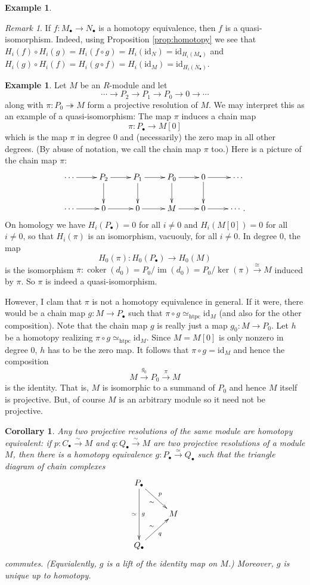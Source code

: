 \documentclass{amsart}[12pt]
\def\htpy{\simeq_{\mathrm{htpc}}}
\def\image{\operatorname{im}}
\def\im{\image}
\def\ker{\operatorname{ker}}
\def\coker{\operatorname{coker}}
\newcommand{\onto}{\twoheadrightarrow}
\newcommand{\id}{\mathrm{id}}
\numberwithin{equation}{section}
\theoremstyle{plain} %
\newtheorem{cor}[equation]{Corollary}
\theoremstyle{definition}
\newtheorem{ex}[equation]{Example}
\theoremstyle{remark}
\newtheorem{rem}[equation]{Remark}
\newcommand{\xra}[1]{\xrightarrow{#1}}
\begin{document}
\begin{ex}
\begin{rem}
If $f: M_\bullet \to N_\bullet$ is  a homotopy equivalence, then $f$ is a quasi-isomorphism. Indeed, using Proposition \ref{prop:homotopy} we see that  $H_i(f)\circ H_i(g)=H_i(f\circ g)=H_i(\id_N)=\id_{H_i(M_\bullet)}$ and $H_i(g)\circ H_i(f)=H_i(g\circ f)=H_i(\id_M)=\id_{H_i(N_\bullet)}$.
\end{rem}



\begin{ex} Let $M$ be an $R$-module and let
$$
\cdots \to P_2 \to P_1 \to P_0 \to 0 \to \cdots
$$
along with $\pi: P_0 \onto M$ form a projective resolution of $M$.  We may interpret this as an example of a quasi-isomorphism:
The map $\pi$ induces a chain map
$$
\pi: P_\bullet \to M[0]
$$
which is the map $\pi$ in degree $0$ and (necessarily) the zero map in all other degrees.
(By abuse of notation, we call the chain map $\pi$ too.) Here is a picture of the chain map $\pi$:
$$
\xymatrix{
  \cdots \ar[r] &  P_2 \ar[r] \ar[d] & P_1 \ar[r] \ar[d] & P_0 \ar[r] \ar[d] & 0 \ar[r] \ar[d] & \cdots \\
  \cdots \ar[r] &  0  \ar[r] & 0 \ar[r]& M \ar[r] & 0 \ar[r] & \cdots. \\
}
$$
On homology we have $H_i(P_\bullet) = 0$ for all $i \ne 0$ and $H_i(M[0]) = 0$ for all $i \ne 0$, so that $H_i(\pi)$ is an isomorphism, vacuouly, for all $i \ne 0$. 
In degree $0$, the map
$$
H_0(\pi): H_0(P_\bullet) \to H_0(M)
$$
is the isomorphism $\overline{\pi}: \coker(d_0)  = P_0/\im(d_0) = P_0/\ker(\pi)  \xra{\cong} M$ induced by $\pi$. So $\pi$ is indeed a quasi-isomorphism.

However, I clam that $\pi$ is not a homotopy equivalence in general. If it were, there would be a chain map $g: M \to P_\bullet$ such that $\pi \circ g \htpy \id_M$ (and also for the other composition).
Note that the chain map $g$ is really just a map $g_0: M \to P_0$. Let $h$ be a homotopy realizing $\pi \circ g \htpy \id_M$. 
Since $M = M[0]$ is only nonzero in degree $0$, $h$ has to be the zero map. It follows that $\pi \circ g = \id_M$ and hence
the composition
$$
M \xra{g_0} P_0 \xra{\pi} M 
$$
is the identity. That is, $M$ is isomorphic to a summand of $P_0$ and hence $M$ itself is projective. But, of course $M$ is an arbitrary module so it need not be projective.
\end{ex}


\begin{cor} \label{cor122}
  Any two projective resolutions of the same module are homotopy equivalent: if $p: C_\bullet \xra{\sim} M$ and
$q: Q_\bullet \xra{\sim} M$ are two projective resolutions of a module $M$, then there is a homotopy equivalence $g: P_\bullet \xra{\simeq} Q_\bullet$
such that the triangle diagram of chain complexes
$$
\xymatrix{
P_\bullet \ar[rd]^p_\sim \ar[dd]^g_\simeq \\
& M \\
Q_\bullet \ar[ru]_q^\sim \\
}
$$
commutes. (Equvialently, $g$ is a lift of the identity map on $M$.) Moreover, $g$ is unique up to homotopy.
\end{cor}




\end{ex}
\end{document}
